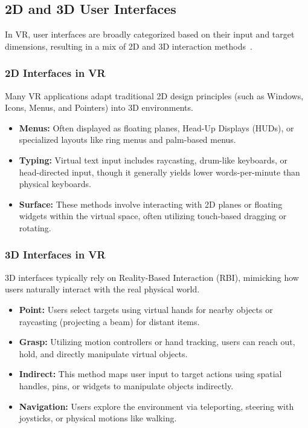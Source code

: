 \documentclass[inscr,ack,preface]{dithesis}
\begin{document}
\subsection{2D and 3D User Interfaces}

In VR, user interfaces are broadly categorized based on their input and target dimensions,
resulting in a mix of 2D and 3D interaction methods~\cite{electronics13030600}.

\subsubsection*{2D Interfaces in VR}
Many VR applications adapt traditional 2D design principles (such as Windows, Icons, Menus, and Pointers) into 3D environments.

\begin{itemize}
  \item \textbf{Menus:} Often displayed as floating planes, Head-Up Displays (HUDs), or specialized layouts like ring menus and
        palm-based menus.
  \item \textbf{Typing:} Virtual text input includes raycasting, drum-like keyboards, or head-directed input, though it generally
        yields lower words-per-minute than physical keyboards.
  \item \textbf{Surface:} These methods involve interacting with 2D planes or floating widgets within the virtual space, often
        utilizing touch-based dragging or rotating.
\end{itemize}

\subsubsection*{3D Interfaces in VR}
3D interfaces typically rely on Reality-Based Interaction (RBI), mimicking how users naturally interact with the real physical world.

\begin{itemize}
  \item \textbf{Point:} Users select targets using virtual hands for nearby objects or raycasting (projecting a beam) for distant items.
  \item \textbf{Grasp:} Utilizing motion controllers or hand tracking, users can reach out, hold, and directly manipulate virtual objects.
  \item \textbf{Indirect:} This method maps user input to target actions using spatial handles, pins, or widgets to manipulate objects indirectly.
  \item \textbf{Navigation:} Users explore the environment via teleporting, steering with joysticks, or physical motions like walking.
\end{itemize}
\end{document}
